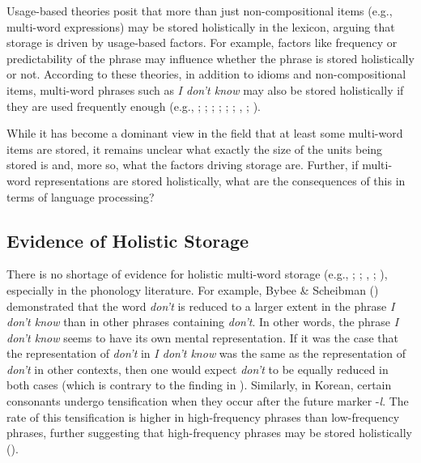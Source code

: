 \documentclass[
  12pt,
  letterpaper,
]{scrreprt}
\begin{document}
Usage-based theories posit that more than just non-compositional items
(e.g., multi-word expressions) may be stored holistically in the
lexicon, arguing that storage is driven by usage-based factors. For
example, factors like frequency or predictability of the phrase may
influence whether the phrase is stored holistically or not. According to
these theories, in addition to idioms and non-compositional items,
multi-word phrases such as \emph{I don't know} may also be stored
holistically if they are used frequently enough (e.g.,
;
;
;
;
;
;
, ;
).

While it has become a dominant view in the field that at least some
multi-word items are stored, it remains unclear what exactly the size of
the units being stored is and, more so, what the factors driving storage
are. Further, if multi-word representations are stored holistically,
what are the consequences of this in terms of language processing?

\subsection{Evidence of Holistic
Storage}\label{evidence-of-holistic-storage}

There is no shortage of evidence for holistic multi-word storage (e.g.,
;
; ,
;
), especially in the phonology literature. For example, Bybee \&
Scheibman ()
demonstrated that the word \emph{don't} is reduced to a larger extent in
the phrase \emph{I don't know} than in other phrases containing
\emph{don't}. In other words, the phrase \emph{I don't know} seems to
have its own mental representation. If it was the case that the
representation of \emph{don't} in \emph{I don't know} was the same as
the representation of \emph{don't} in other contexts, then one would
expect \emph{don't} to be equally reduced in both cases (which is
contrary to the finding in
).
Similarly, in Korean, certain consonants undergo tensification when they
occur after the future marker -\emph{l}. The rate of this tensification
is higher in high-frequency phrases than low-frequency phrases, further
suggesting that high-frequency phrases may be stored holistically
().
\end{document}
